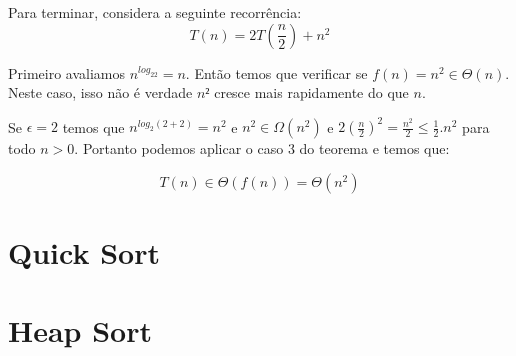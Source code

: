 \begin{example}
  Para terminar, considera a seguinte recorrência:
  \begin{displaymath}
    T(n) = 2T\left(\frac{n}{2}\right) + n^2
  \end{displaymath}

  Primeiro avaliamos $n^{log_22} = n$.
  Então temos que verificar se $f(n) = n^2 \in \Theta(n)$.
  Neste caso, isso não é verdade $n²$ cresce mais rapidamente do que $n$.
  
  Se $\epsilon = 2$ temos que $n^{log_2(2+2)} = n^2$ e $n^2 \in \Omega(n^2)$ e $2(\frac{n}{2})^2 = \frac{n^2}{2} \leq \frac{1}{2}.n^2$ para todo $n > 0$.  
  Portanto podemos aplicar o caso 3 do teorema e temos que:

  \begin{displaymath}
    T(n) \in \Theta(f(n)) = \Theta(n^2)
  \end{displaymath}
\end{example}



\section{Quick Sort}
\section{Heap Sort}
